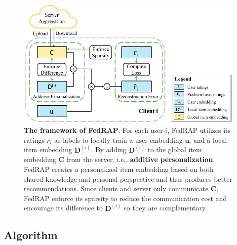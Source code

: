 \documentclass{article} %
\begin{document}
\begin{figure}[!htbp]
    \centering
    \includegraphics[width = .7\linewidth]{new-framework.pdf}
    \caption{
        \textbf{The framework of FedRAP}. 
        For each user-$i$, FedRAP utilizes its ratings $r_i$ as labels to locally train a user embedding $\mathbf{u}_i$ and a local item embedding $\mathbf{D}^{(i)}$. By adding $\mathbf{D}^{(i)}$ to the global item embedding $\mathbf{C}$ from the server, i.e., \textbf{additive personalization}, FedRAP creates a personalized item embedding based on both shared knowledge and personal perspective and thus produces better recommendations. Since clients and server only communicate $\mathbf{C}$, FedRAP enforce its sparsity to reduce the communication cost and encourage its difference to $\mathbf{D}^{(i)}$ so they are complementary. 
    }
\label{fig:framework}
\end{figure}


\subsection{Algorithm}
\end{document}
